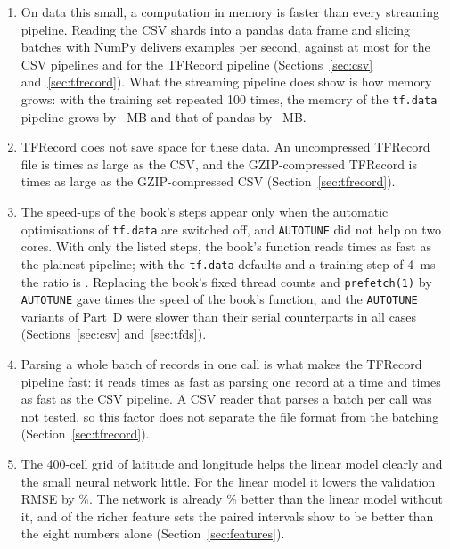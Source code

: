 \documentclass[11pt,a4paper]{article}
\begin{document}
\begin{enumerate}
\item On data this small, a computation in memory is faster than every streaming pipeline. Reading the CSV shards into a pandas data frame and slicing batches with NumPy delivers  examples per second, against at most  for the CSV pipelines and  for the TFRecord pipeline (Sections~\ref{sec:csv} and~\ref{sec:tfrecord}). What the streaming pipeline does show is how memory grows: with the training set repeated 100 times, the memory of the \texttt{tf.data} pipeline grows by ~MB and that of pandas by ~MB.

\item TFRecord does not save space for these data. An uncompressed TFRecord file is  times as large as the CSV, and the GZIP-compressed TFRecord is  times as large as the GZIP-compressed CSV (Section~\ref{sec:tfrecord}).

\item The speed-ups of the book's steps appear only when the automatic optimisations of \texttt{tf.data} are switched off, and \texttt{AUTOTUNE} did not help on two cores. With only the listed steps, the book's function reads  times as fast as the plainest pipeline; with the \texttt{tf.data} defaults and a training step of 4~ms the ratio is . Replacing the book's fixed thread counts and \texttt{prefetch(1)} by \texttt{AUTOTUNE} gave  times the speed of the book's function, and the \texttt{AUTOTUNE} variants of Part~D were slower than their serial counterparts in all  cases (Sections~\ref{sec:csv} and~\ref{sec:tfds}).

\item Parsing a whole batch of records in one call is what makes the TFRecord pipeline fast: it reads  times as fast as parsing one record at a time and  times as fast as the CSV pipeline. A CSV reader that parses a batch per call was not tested, so this factor does not separate the file format from the batching (Section~\ref{sec:tfrecord}).

\item The 400-cell grid of latitude and longitude helps the linear model clearly and the small neural network little. For the linear model it lowers the validation RMSE by \%. The network is already \% better than the linear model without it, and of the  richer feature sets the paired intervals show  to be better than the eight numbers alone (Section~\ref{sec:features}).


\end{enumerate}
\end{document}
